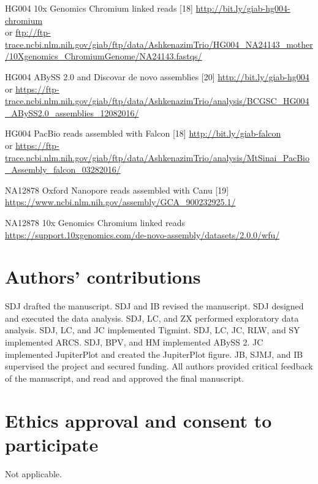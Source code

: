 \documentclass{bmcart}
\begin{document}
\begin{backmatter}
HG004 10x Genomics Chromium linked reads {[}18{]} \url{http://bit.ly/giab-hg004-chromium}\\
or \url{ftp://ftp-trace.ncbi.nlm.nih.gov/giab/ftp/data/AshkenazimTrio/HG004_NA24143_mother/10Xgenomics_ChromiumGenome/NA24143.fastqs/}

HG004 ABySS 2.0 and Discovar de novo assemblies {[}20{]} \url{http://bit.ly/giab-hg004}\\
or \url{https://ftp-trace.ncbi.nlm.nih.gov/giab/ftp/data/AshkenazimTrio/analysis/BCGSC_HG004_ABySS2.0_assemblies_12082016/}

HG004 PacBio reads assembled with Falcon {[}18{]} \url{http://bit.ly/giab-falcon}\\
or \url{https://ftp-trace.ncbi.nlm.nih.gov/giab/ftp/data/AshkenazimTrio/analysis/MtSinai_PacBio_Assembly_falcon_03282016/}

NA12878 Oxford Nanopore reads assembled with Canu {[}19{]}\\
\url{https://www.ncbi.nlm.nih.gov/assembly/GCA_900232925.1/}

NA12878 10x Genomics Chromium linked reads\\
\url{https://support.10xgenomics.com/de-novo-assembly/datasets/2.0.0/wfu/}

\hypertarget{authors-contributions}{%
\section*{Authors' contributions}\label{authors-contributions}}

SDJ drafted the manuscript. SDJ and IB revised the manuscript. SDJ designed and executed the data analysis. SDJ, LC, and ZX performed exploratory data analysis. SDJ, LC, and JC implemented Tigmint. SDJ, LC, JC, RLW, and SY implemented ARCS. SDJ, BPV, and HM implemented ABySS 2. JC implemented JupiterPlot and created the JupiterPlot figure. JB, SJMJ, and IB supervised the project and secured funding. All authors provided critical feedback of the manuscript, and read and approved the final manuscript.

\hypertarget{ethics-approval-and-consent-to-participate}{%
\section*{Ethics approval and consent to participate}\label{ethics-approval-and-consent-to-participate}}

Not applicable.

\hypertarget{competing-interests}{%
}
\end{backmatter}
\end{document}
